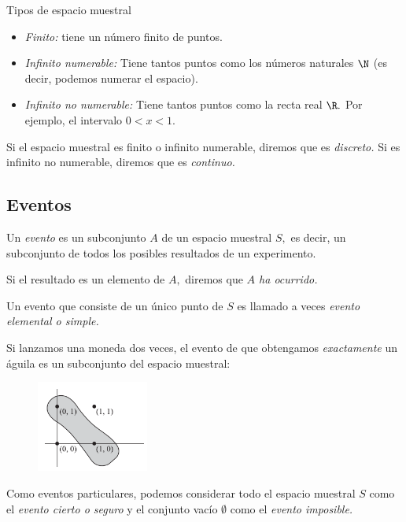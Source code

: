 {Tipos de espacio muestral}
\begin{itemize}
 \item \emph{Finito:} tiene un número finito de puntos.
 \item \emph{Infinito numerable:} Tiene tantos puntos como los números naturales $\N$ (es decir, podemos numerar el espacio).
 \item \emph{Infinito no numerable:} Tiene tantos puntos como la recta real $\R.$  Por ejemplo, el intervalo $0<x<1.$
\end{itemize}


{}
Si el espacio muestral es finito o infinito numerable, diremos que es \emph{discreto.}  Si es infinito no numerable, diremos que es \emph{continuo.}

\subsection{Eventos}
{}
Un \emph{evento} es un subconjunto $A$ de un espacio muestral $S,$ es decir, un subconjunto de todos los posibles resultados de un experimento. 

Si el resultado es un elemento de $A,$ diremos que \emph{$A$ ha ocurrido.} 

Un evento que consiste de un único punto de $S$ es llamado a veces \emph{evento elemental o simple.}

{}
\begin{ejemplo}
 \label{exmp:1.8}
 Si lanzamos una moneda dos veces, el evento de que obtengamos \emph{exactamente} un águila  es un subconjunto del espacio muestral:
 
 \begin{figure}[h]
 \centering
 \includegraphics[height=3cm,keepaspectratio=true]{./pe/pands0102.png}
 \label{pands0102}
\end{figure}

\end{ejemplo}


{}
Como eventos particulares, podemos considerar todo el espacio muestral $S$ como el \emph{evento cierto o seguro} y el conjunto vacío $\emptyset$ como el \emph{evento imposible.}


